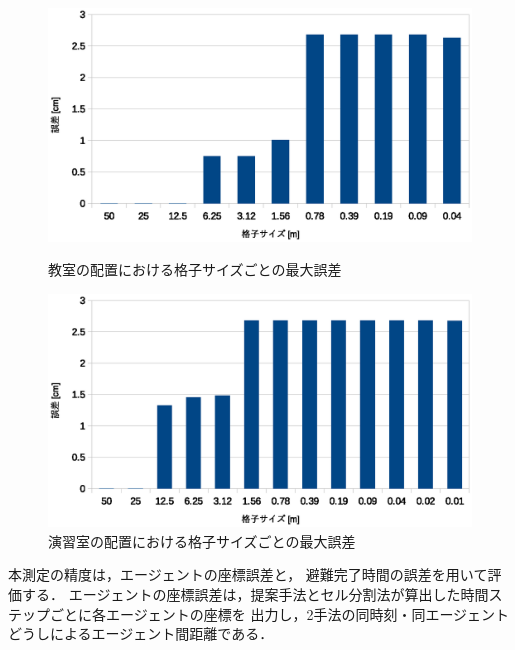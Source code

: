 \begin{figure}[tb]
	\begin{minipage}[b]{0.48\columnwidth}
		\begin{center}
		\includegraphics[width=\columnwidth]{figure/20231016_kyositu_gosa.eps}
		\caption{教室の配置における格子サイズごとの最大誤差}
		\label{fig:kyositu_gosa}
		\end{center}
	\end{minipage}
	\hspace{0.04\columnwidth}
	\begin{minipage}[b]{0.48\columnwidth}
		\begin{center}
		\includegraphics[width=\columnwidth]{figure/20231016_pc_gosa.eps}
		\caption{演習室の配置における格子サイズごとの最大誤差}
		\label{fig:pc_gosa}
		\end{center}
	\end{minipage}
\end{figure}
%
本測定の精度は，エージェントの座標誤差と，
避難完了時間の誤差を用いて評価する．
エージェントの座標誤差は，提案手法とセル分割法が算出した時間ステップごとに各エージェントの座標を
出力し，2手法の同時刻・同エージェントどうしによるエージェント間距離である．
